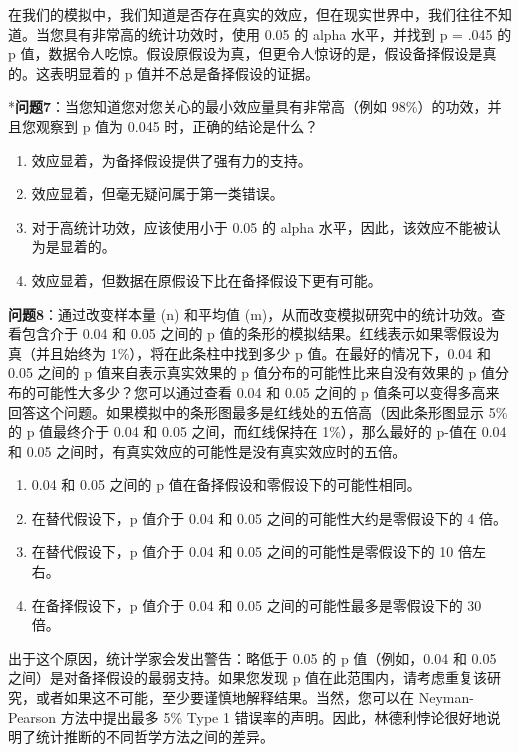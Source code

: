 \documentclass[
  letterpaper,
  DIV=11,
  numbers=noendperiod]{scrreprt}
\providecommand{\tightlist}{%
  \setlength{\itemsep}{0pt}\setlength{\parskip}{0pt}}\usepackage{longtable,booktabs,array}
\begin{document}
在我们的模拟中，我们知道是否存在真实的效应，但在现实世界中，我们往往不知道。当您具有非常高的统计功效时，使用
0.05 的 alpha 水平，并找到 p = .045 的 p
值，数据令人吃惊。假设原假设为真，但更令人惊讶的是，假设备择假设是真的。这表明显着的
p 值并不总是备择假设的证据。

*\textbf{问题7}：当您知道您对您关心的最小效应量具有非常高（例如
98\%）的功效，并且您观察到 p 值为 0.045 时，正确的结论是什么？

\begin{enumerate}
\def\labelenumi{\Alph{enumi})}
\tightlist
\item
  效应显着，为备择假设提供了强有力的支持。
\item
  效应显着，但毫无疑问属于第一类错误。
\item
  对于高统计功效，应该使用小于 0.05 的 alpha
  水平，因此，该效应不能被认为是显着的。
\item
  效应显着，但数据在原假设下比在备择假设下更有可能。
\end{enumerate}

\textbf{问题8}：通过改变样本量 (n) 和平均值
(m)，从而改变模拟研究中的统计功效。查看包含介于 0.04 和 0.05 之间的 p
值的条形的模拟结果。红线表示如果零假设为真（并且始终为
1\%），将在此条柱中找到多少 p 值。在最好的情况下，0.04 和 0.05 之间的 p
值来自表示真实效果的 p 值分布的可能性比来自没有效果的 p
值分布的可能性大多少？您可以通过查看 0.04 和 0.05 之间的 p
值条可以变得多高来回答这个问题。如果模拟中的条形图最多是红线处的五倍高（因此条形图显示
5\% 的 p 值最终介于 0.04 和 0.05 之间，而红线保持在 1\%），那么最好的
p-值在 0.04 和 0.05 之间时，有真实效应的可能性是没有真实效应时的五倍。

\begin{enumerate}
\def\labelenumi{\Alph{enumi})}
\tightlist
\item
  0.04 和 0.05 之间的 p 值在备择假设和零假设下的可能性相同。
\item
  在替代假设下，p 值介于 0.04 和 0.05 之间的可能性大约是零假设下的 4
  倍。
\item
  在替代假设下，p 值介于 0.04 和 0.05 之间的可能性是零假设下的 10
  倍左右。
\item
  在备择假设下，p 值介于 0.04 和 0.05 之间的可能性最多是零假设下的 30
  倍。
\end{enumerate}

出于这个原因，统计学家会发出警告：略低于 0.05 的 p 值（例如，0.04 和
0.05 之间）是对备择假设的最弱支持。如果您发现 p
值在此范围内，请考虑重复该研究，或者如果这不可能，至少要谨慎地解释结果。当然，您可以在
Neyman-Pearson 方法中提出最多 5\% Type 1
错误率的声明。因此，林德利悖论很好地说明了统计推断的不同哲学方法之间的差异。
\end{document}
